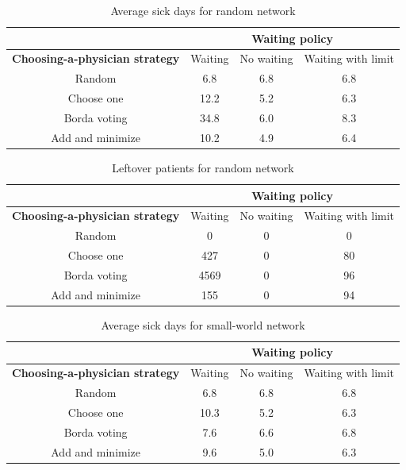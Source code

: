 \begin{table}[!t]
\centering
\caption{Average sick days for random network}

\begin{tabular}{|c|c|c|c|}
\hline
& \multicolumn{3}{c|}{\textbf{Waiting policy}}\\ \hline
\textbf{Choosing-a-physician strategy}
& Waiting & No waiting & Waiting with limit\\ \hline
Random&  6.8&  6.8& 6.8\\ \hline
Choose one& 12.2 &  5.2& 6.3\\ \hline
Borda voting& 34.8 & 6.0 & 8.3\\ \hline
Add and minimize & 10.2 & 4.9 & 6.4\\ \hline
\end{tabular}
\label{ch3:tdran}
\end{table}

\begin{table}[!t]
\centering
\caption{Leftover patients for random network}

\begin{tabular}{|c|c|c|c|}
\hline
& \multicolumn{3}{c|}{\textbf{Waiting policy}}\\ \hline
\textbf{Choosing-a-physician strategy}
& Waiting & No waiting & Waiting with limit\\ \hline
Random&  0&  0& 0\\ \hline
Choose one&  427&  0& 80\\ \hline
Borda voting&  4569&  0& 96\\ \hline
Add and minimize & 155 &  0& 94 \\ \hline
\end{tabular}
\label{ch3:tpran}
\end{table}


\begin{table}[!t]
\centering
\caption{Average sick days for small-world network}

\begin{tabular}{|c|c|c|c|}
\hline
& \multicolumn{3}{c|}{\textbf{Waiting policy}}\\ \hline
\textbf{Choosing-a-physician strategy}
& Waiting & No waiting & Waiting with limit\\ \hline
Random&  6.8&  6.8& 6.8\\ \hline
Choose one& 10.3 & 5.2 & 6.3\\ \hline
Borda voting& 7.6 & 6.6 & 6.8\\ \hline
Add and minimize & 9.6 & 5.0 & 6.3\\ \hline
\end{tabular}
\label{ch3:tdsmall}
\end{table}

